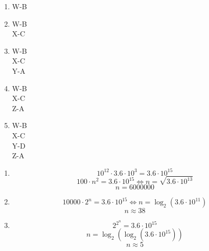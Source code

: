 \documentclass[a4paper, 12pt, margins=3cm]{homework}
\begin{document}
  \begin{problem}
    
  \end{problem}
  \begin{solution} \hfill
    \begin{enumerate}\itemsep0pt
      \item W-B
      \item W-B \\ X-C
      \item W-B \\ X-C \\ Y-A
      \item W-B \\ X-C \\ Z-A
      \item W-B \\ X-C \\ Y-D \\ Z-A
    \end{enumerate}
  \end{solution}


  \begin{problem}
   
  \end{problem}
  \begin{solution} \hfill
    \begin{enumerate}\itemsep0pt
      \item \[ 10^{12} \cdot 3.6\cdot 10^{3} = 3.6 \cdot 10^{15} \]
            \[ 100\cdot n^2 = 3.6\cdot 10^{15} \Longleftrightarrow n = \sqrt{3.6\cdot 10^{13}} \]
            \[ n = 6000000 \]

      \item \[ 10000\cdot 2^n = 3.6\cdot 10^{15} \Longleftrightarrow n = \log_2(3.6\cdot 10^{11}) \]
            \[ n \approx 38 \]

      \item \[ 2^{2^n} = 3.6\cdot 10^{15} \]
            \[ n = \log_2(\log_2(3.6\cdot 10^{15})) \]
            \[ n \approx 5 \]
    \end{enumerate}
  \end{solution}
\end{document}
